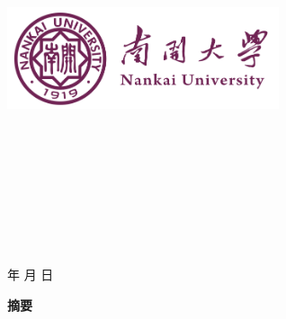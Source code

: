 \documentclass[12pt,a4paper]{article}
\begin{document}
\renewcommand{\contentsname}{目录}
\renewcommand{\appendixname}{附录}
\renewcommand{\appendixpagename}{附录}
\renewcommand{\refname}{参考文献} 
\renewcommand{\figurename}{图}
\renewcommand{\tablename}{表}
\renewcommand{\abstractname}{摘要}
\renewcommand{\today}{\number\year 年 \number\month 月 \number\day 日}

\renewcommand {\thefigure}{\thesection{}.\arabic{figure}}%
\renewcommand{\figurename}{图}
\renewcommand{\contentsname}{目录}  

\begin{titlepage}
    \begin{center}
    \includegraphics[width=0.6\textwidth]{NKU.png}\\[1cm]
    \vspace{20mm}
		\textbf{\huge\textbf{}}\\[0.5cm]
		\textbf{\huge{}}\\[2.3cm]

		\vspace{\fill}
    
    \centering
    \textsc{\LARGE {}}\\[0.5cm]
    \textsc{\LARGE {}}\\[0.5cm]
    \textsc{\LARGE {}}\\[0.5cm]
    \textsc{\LARGE {}}\\[0.5cm]
    \textsc{\LARGE {}}\\[0.5cm]
    \textsc{\LARGE {}}\\[0.5cm]
    \vfill
    {\Large \today}
    \end{center}
\end{titlepage}

\clearpage
{} %
\begin{center}
    {\songti\bfseries 摘\quad 要}
\end{center}
\vspace{0.5em}
\small
\setlength{\parindent}{2em} %
\end{document}

